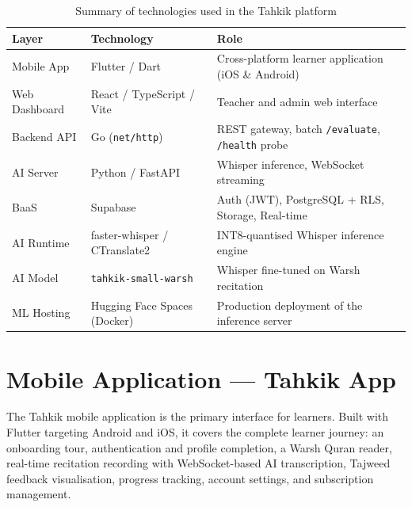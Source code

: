 \begin{table}[H]
  \centering
  \caption{Summary of technologies used in the Tahkik platform}
  \label{tab:impl_tech_summary}
  \renewcommand{\arraystretch}{1.4}
  \begin{tabular}{llp{7cm}}
    \toprule
    \textbf{Layer} & \textbf{Technology} & \textbf{Role} \\
    \midrule
    Mobile App     & Flutter / Dart            & Cross-platform learner application (iOS \& Android) \\
    Web Dashboard  & React / TypeScript / Vite & Teacher and admin web interface \\
    Backend API    & Go (\texttt{net/http})    & REST gateway, batch \texttt{/evaluate}, \texttt{/health} probe \\
    AI Server      & Python / FastAPI          & Whisper inference, WebSocket streaming \\
    BaaS           & Supabase                  & Auth (JWT), PostgreSQL + RLS, Storage, Real-time \\
    AI Runtime     & faster-whisper / CTranslate2 & INT8-quantised Whisper inference engine \\
    AI Model       & \texttt{tahkik-small-warsh} & Whisper fine-tuned on Warsh recitation \\
    ML Hosting     & Hugging Face Spaces (Docker) & Production deployment of the inference server \\
    \bottomrule
  \end{tabular}
\end{table}

\section{Mobile Application — Tahkik App}
\label{sec:impl_mobile}

\begin{emeraldbox}[title=Mobile Application]
The Tahkik mobile application is the primary interface for learners. Built with Flutter targeting Android and iOS, it covers the complete learner journey: an onboarding tour, authentication and profile completion, a Warsh Quran reader, real-time recitation recording with WebSocket-based AI transcription, Tajweed feedback visualisation, progress tracking, account settings, and subscription management.
\end{emeraldbox}


